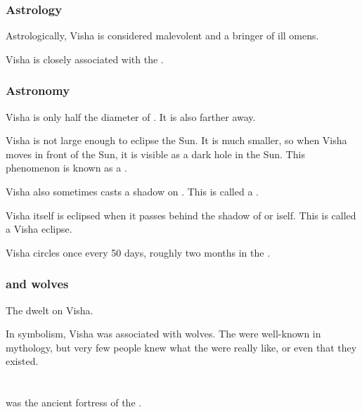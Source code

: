 \subsubsection{Astrology}
Astrologically, Visha is considered malevolent and a bringer of ill omens. 

Visha is closely associated with the . 





\subsubsection{Astronomy}
Visha is only half the diameter of \Dun{}. 
It is also farther away. 

Visha is not large enough to eclipse the Sun. It is much smaller, so when Visha moves in front of the Sun, it is visible as a dark hole in the Sun. This phenomenon is known as a . 

Visha also sometimes casts a shadow on \Dun{}. This is called a . 

Visha itself is eclipsed when it passes behind the shadow of \Dun{} or \Miith{} iself. This is called a Visha eclipse. 

Visha circles \Miith{} once every 50 days, roughly two months in the .





\subsubsection{\Vorcanths{} and wolves}
The  dwelt on Visha. 

In symbolism, Visha was associated with wolves. 
The  were well-known in mythology, but very few people knew what the \vorcanths{} were really like, or even that they existed. 
















\section{\Nithdornazsh}
\index{\Nithdornazsh}
\Nithdornazsh{} was the ancient \draconic{} fortress of the \dragonking{} \Nexagglachel. 

